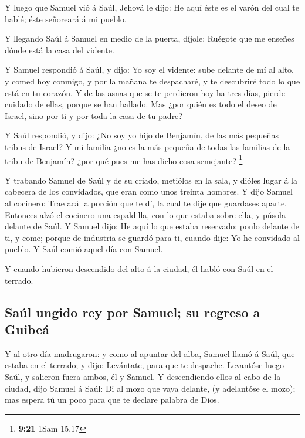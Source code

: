  Y luego que Samuel vió á Saúl, Jehová le dijo: He aquí
éste es el varón del cual te hablé; éste señoreará á mi pueblo.

 Y llegando Saúl á Samuel en medio de la puerta, díjole:
Ruégote que me enseñes dónde está la casa del vidente.

 Y Samuel respondió á Saúl, y dijo: Yo soy el vidente: sube
delante de mí al alto, y comed hoy conmigo, y por la mañana te
despacharé, y te descubriré todo lo que está en tu corazón.
 Y de las asnas que se te perdieron hoy ha tres días,
pierde cuidado de ellas, porque se han hallado. Mas ¿por quién es todo
el deseo de Israel, sino por ti y por toda la casa de tu padre?

 Y Saúl respondió, y dijo: ¿No soy yo hijo de Benjamín, de
las más pequeñas tribus de Israel? Y mi familia ¿no es la más pequeña de
todas las familias de la tribu de Benjamín? ¿por qué pues me has dicho
cosa semejante? \footnote{\textbf{9:21} 1Sam 15,17}

 Y trabando Samuel de Saúl y de su criado, metiólos en la
sala, y dióles lugar á la cabecera de los convidados, que eran como unos
treinta hombres.  Y dijo Samuel al cocinero: Trae acá la
porción que te dí, la cual te dije que guardases aparte. 
Entonces alzó el cocinero una espaldilla, con lo que estaba sobre ella,
y púsola delante de Saúl. Y Samuel dijo: He aquí lo que estaba
reservado: ponlo delante de ti, y come; porque de industria se guardó
para ti, cuando dije: Yo he convidado al pueblo. Y Saúl comió aquel día
con Samuel.

 Y cuando hubieron descendido del alto á la ciudad, él
habló con Saúl en el terrado.

\hypertarget{sauxfal-ungido-rey-por-samuel-su-regreso-a-guibeuxe1}{%
\subsection{Saúl ungido rey por Samuel; su regreso a
Guibeá}\label{sauxfal-ungido-rey-por-samuel-su-regreso-a-guibeuxe1}}

 Y al otro día madrugaron: y como al apuntar del alba,
Samuel llamó á Saúl, que estaba en el terrado; y dijo: Levántate, para
que te despache. Levantóse luego Saúl, y salieron fuera ambos, él y
Samuel.  Y descendiendo ellos al cabo de la ciudad, dijo
Samuel á Saúl: Di al mozo que vaya delante, (y adelantóse el mozo); mas
espera tú un poco para que te declare palabra de Dios.

